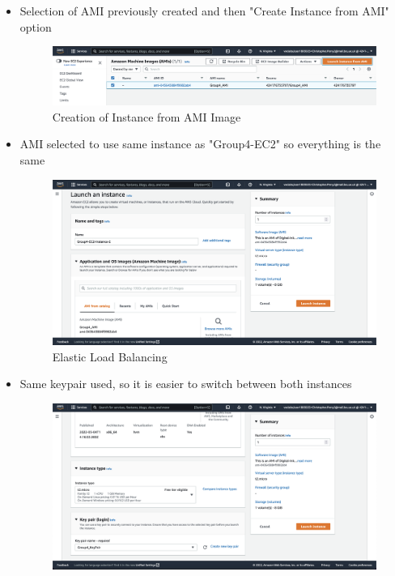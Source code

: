 \begin{itemize}
	\item Selection of AMI previously created and then "Create Instance from AMI" option \begin{figure}
	      \centering
	      \includegraphics[width=\textwidth]{resources/elb/elb-instance-from-ami.png}
	      \caption{Creation of Instance from AMI Image}
	      \label{fig:elb-instance-from-ami}
	\end{figure}
	\item AMI selected to use same instance as "Group4-EC2" so everything is the same \begin{figure}
	      \centering
	      \includegraphics[width=\textwidth]{resources/elb/elb-instance-2-name.png}
	      \caption{Elastic Load Balancing}
	      \label{fig:elb-instance-2-name}
	\end{figure}
	\item Same keypair used, so it is easier to switch between both instances \begin{figure}
	      \centering
	      \includegraphics[width=\textwidth]{resources/elb/elb-instance-2-type-and-keypair.png}

\end{figure}
\end{itemize}
